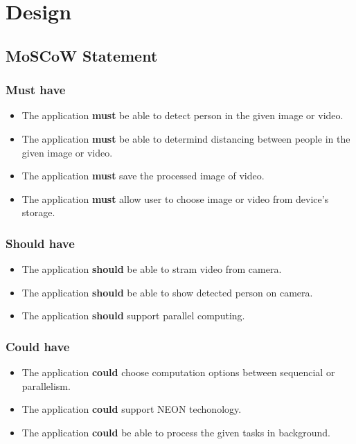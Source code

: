 \chapter{Design}\label{design}

\section{MoSCoW Statement}


    \subsection{Must have}
        \begin{itemize}
            \setlength\itemsep{1em}
            \item The application \textbf{must} be able to detect person in the given image or video.
            \item The application \textbf{must} be able to determind distancing between people in the given image or video.
            \item The application \textbf{must} save the processed image of video.
            \item The application \textbf{must} allow user to choose image or video from device's storage.
        \end{itemize}

    \subsection{Should have}
        \begin{itemize}
            \item The application \textbf{should} be able to stram video from camera.
            \item The application \textbf{should} be able to show detected person on camera.
            \item The application \textbf{should} support parallel computing.
        \end{itemize}

    \subsection{Could have}
        \begin{itemize}
            \item The application \textbf{could} choose computation options between sequencial or parallelism.
            \item The application \textbf{could} support NEON techonology.
            \item The application \textbf{could} be able to process the given tasks in background.
        \end{itemize}
